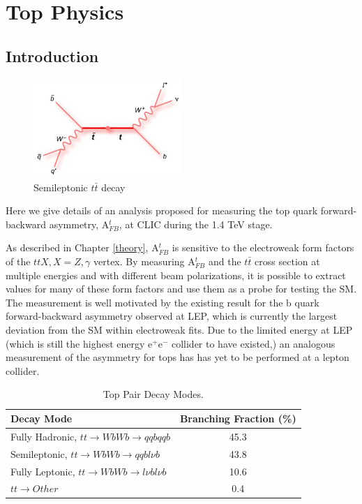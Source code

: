 \chapter{Top Physics}
\label{chapter:topanalysis}
\section{Introduction}

\begin{figure}
  \centering
  \includegraphics[width=0.5\textwidth]{TopAnalysis/figures/TopFeynmann.jpg}
  \caption[Semileptonic $t\bar{t}$ decay]{Semileptonic $t\bar{t}$ decay}
  \label{fig:topfeynmann}
\end{figure}

Here we give details of an analysis proposed for measuring the top quark forward-backward asymmetry, A$_{FB}^t$, at CLIC during the 1.4 TeV stage. 

As described in Chapter \ref{theory}, A$_{FB}^t$ is sensitive to the electroweak form factors of the $ttX, X=Z,\gamma$ vertex. By measuring A$_{FB}^t$ and the $t\bar{t}$ cross section at multiple energies and with different beam polarizations, it is possible to extract values for many of these form factors and use them as a probe for testing the \ac{SM}. The measurement is well motivated by the existing result for the b quark forward-backward asymmetry observed at \ac{LEP}\cite{ABBIENDI200229}, which is currently the largest deviation from the \ac{SM} within electroweak fits. Due to the limited energy at \ac{LEP} (which is still the highest energy e$^+$e$^-$ collider to have existed,) an analogous measurement of the asymmetry for tops has has yet to be performed at a lepton collider. 

\begin{table}[b]
  \centering
  \begin{tabular}{l |c}
    \toprule
    Decay Mode     & Branching Fraction (\%) \\
    \midrule
    Fully Hadronic, $tt\rightarrow WbWb\rightarrow qqbqqb$ & 45.3  \\
    \midrule
    Semileptonic, $tt\rightarrow WbWb\rightarrow qqbl\nu b$ & 43.8 \\
    \midrule
    Fully Leptonic, $tt\rightarrow WbWb\rightarrow l\nu bl\nu b$ & 10.6 \\
    \midrule
    $tt\rightarrow Other$ & 0.4 \\
    \bottomrule
  \end{tabular}
  \caption[Top Pair Decay Modes]{Top Pair Decay Modes\cite{Patrignani:2016xqp}.}
  \label{table:topdecaymodes}
\end{table}

